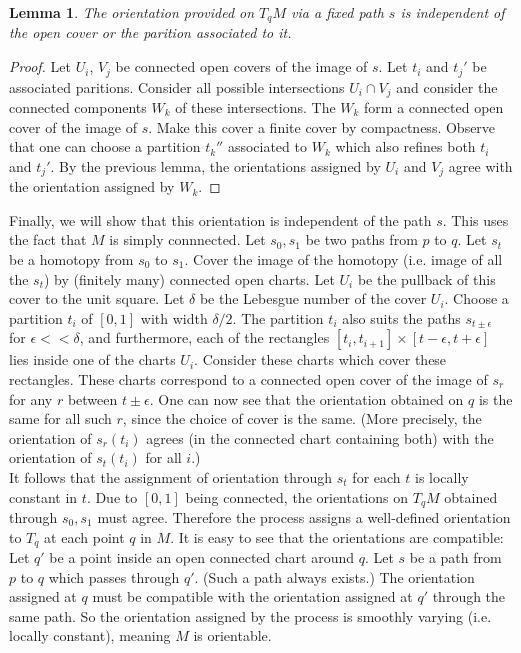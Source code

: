 \documentclass{amsart}
\numberwithin{equation}{section}
\theoremstyle{plain}
\newtheorem{lemma}[theorem]{Lemma}
\theoremstyle{definition}
\theoremstyle{remark}
\renewcommand{\_}[2]{\underbrace{#1}_{#2}}
\renewcommand{\^}[2]{\overbrace{#1}_{#2}}
\begin{document}
  \begin{lemma}
    The orientation provided on $T_qM$ via a fixed path $s$ is independent of the open cover or the parition associated to it.
  \end{lemma}
  \begin{proof}
    Let $U_i$, $V_j$ be connected open covers of the image of $s$. Let $t_i$ and $t_j'$ be associated paritions. Consider all possible intersections $U_i \cap V_j$ and consider the connected components $W_k$ of these intersections. The $W_k$ form a connected open cover of the image of $s$. Make this cover a finite cover by compactness. Observe that one can choose a partition $t_k''$ associated to $W_k$ which also refines both $t_i$ and $t_j'$. By the previous lemma, the orientations assigned by $U_i$ and $V_j$ agree with the orientation assigned by $W_k$. 
  \end{proof}

  Finally, we will show that this orientation is independent of the path $s$. This uses the fact that $M$ is simply connnected. Let $s_0, s_1$ be two paths from $p$ to $q$. Let $s_t$ be a homotopy from $s_0$ to $s_1$. Cover the image of the homotopy (i.e. image of all the $s_t$) by (finitely many) connected open charts. Let $U_i$ be the pullback of this cover to the unit square. Let $\delta$ be the Lebesgue number of the cover $U_i$. Choose a partition $t_i$ of $[0,1]$ with width $\delta/2$. The partition $t_i$ also suits the paths $s_{t\pm\epsilon}$ for $\epsilon << \delta$, and furthermore, each of the rectangles $[t_i,t_{i+1}] \times [t-\epsilon, t+\epsilon]$ lies inside one of the charts $U_i$. Consider these charts which cover these rectangles. These charts correspond to a connected open cover of the image of $s_r$ for any $r$ between $t\pm \epsilon$. One can now see that the orientation obtained on $q$ is the same for all such $r$, since the choice of cover is the same. (More precisely, the orientation of $s_r(t_i)$ agrees (in the connected chart containing both) with the orientation of $s_t(t_i)$ for all $i$.)\\

  It follows that the assignment of orientation through $s_t$ for each $t$ is locally constant in $t$. Due to $[0,1]$ being connected, the orientations on $T_qM$ obtained through $s_0, s_1$ must agree. Therefore the process assigns a well-defined orientation to $T_q$ at each point $q$ in $M$. It is easy to see that the orientations are compatible: Let $q'$ be a point inside an open connected chart around $q$. Let $s$ be a path from $p$ to $q$ which passes through $q'$. (Such a path always exists.) The orientation assigned at $q$ must be compatible with the orientation assigned at $q'$ through the same path. So the orientation assigned by the process is smoothly varying (i.e. locally constant), meaning $M$ is orientable.
  
\end{document}
